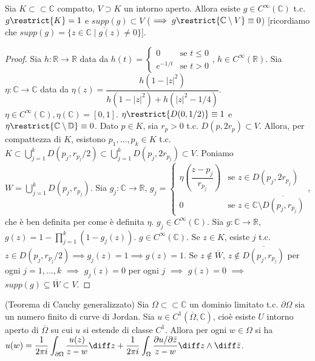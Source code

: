\begin{lm} \label{taglio}
  Sia $K \subset \subset \mathbb{C}$ compatto, $V \supset K$ un intorno aperto. Allora esiste $g \in C^{\infty}(\mathbb{C})$ t.c. $g\restrict{K}=1$ e $supp(g) \subset V$ ($\implies g\restrict{\mathbb{C}\setminus V}\equiv 0$) [ricordiamo che $supp(g)=\overline{\{z \in \mathbb{C} \mid g(z)\not=0\}}$].
\end{lm}

\begin{proof}
  Sia $h: \mathbb{R} \longrightarrow \mathbb{R}$ data da $h(t)=\begin{cases}
    0 & \mbox{se }t\le 0\\ e^{-1/t} & \mbox{se }t>0
\end{cases}$, $h \in C^{\infty}(\mathbb{R})$. Sia $\eta: \mathbb{C} \longrightarrow \mathbb{C}$ data da $\eta(z)=\dfrac{h(1-|z|^2)}{h(1-|z|^2)+h(|z|^2-1/4)}$. $\eta \in C^{\infty}(\mathbb{C}), \eta(\mathbb{C})=[0, 1]$.
$\eta\restrict{D(0, 1/2)}\equiv 1$ e $\eta\restrict{\mathbb{C}\setminus \mathbb{D}} \equiv 0$. Dato $p \in K$, sia $r_p>0$ t.c. $D(p, 2r_p) \subset V$.
Allora, per compattezza di $K$, esistono $p_1, \dots, p_k \in K$ t.c. $\displaystyle K \subset \bigcup_{j=1}^k D(p_j, r_{p_j}/2) \subset \bigcup_{j=1}^k D(p_j, 2r_{p_j}) \subset V$. Poniamo $\displaystyle W=\bigcup_{j=1}^k D(p_j, r_{p_j})$.
Sia $g_j:\mathbb{C} \longrightarrow \mathbb{R}$, $g_j=\begin{cases}
  \eta\left(\dfrac{z-p_j}{r_{p_j}}\right) & \mbox{se }z\in D(p_j, 2r_{p_j})\\ 0 & \mbox{se }z\in\mathbb{C} \setminus \overline{D(p_j, r_{p_j})}
\end{cases}$, che è ben definita per come è definita $\eta$. $g_j \in C^{\infty}(\mathbb{C})$. Sia $g: \mathbb{C} \longrightarrow \mathbb{R}$, $\displaystyle g(z)=1-\prod_{j=1}^k (1-g_j(z))$. $g \in C^{\infty}(\mathbb{C})$.
Se $z \in K$, esiste $j$ t.c. $z \in D(p_j, r_{p_j}/2) \implies g_j(z)=1 \implies g(z)=1$. Se $z \not\in \overline{W}$, $z \not\in\overline{D(p_j, r_{p_j})}$ per ogni $j=1, \dots, k$ $\implies$ $g_j(z)=0$ per ogni $j$ $\implies$ $g(z)=0$ $\implies$ $supp(g) \subseteq \overline{W} \subset V$.
\end{proof}

\begin{thm}
  (Teorema di Cauchy generalizzato) Sia $\Omega \subset \subset \mathbb{C}$ un dominio limitato t.c. $\partial\Omega$ sia un numero finito di curve di Jordan. Sia $u \in C^1(\overline{\Omega}, \mathbb{C})$, cioè esiste $U$ intorno aperto di $\overline{\Omega}$ su cui $u$ si estende di classe $C^1$.
  Allora per ogni $w \in \Omega$ si ha $\displaystyle u(w)=\dfrac{1}{2\pi i}\int_{\partial \Omega} \dfrac{u(z)}{z-w}\diff z+\dfrac{1}{2\pi i}\int_{\Omega} \dfrac{\partial u/\partial\bar{z}}{z-w}\diff z \wedge \diff \bar{z}$.
\end{thm}

